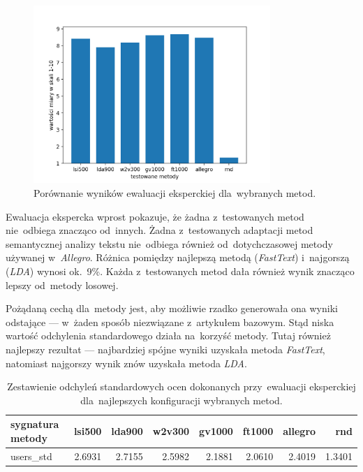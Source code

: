 \documentclass[pl]{minipw} %
\begin{document}
\begin{figure}[H]
	\centering
	\includegraphics[width=0.8\textwidth]{img/results/lsi500_lda900_w2v300_gv1000_ft1000_allegro_rnd_users.png}
	\caption{Porównanie wyników ewaluacji eksperckiej dla~wybranych metod.}
\end{figure}

Ewaluacja ekspercka wprost pokazuje, że żadna z~testowanych metod nie~odbiega znacząco od~innych. Żadna z~testowanych adaptacji metod semantycznej analizy tekstu nie~odbiega również od~dotychczasowej metody używanej w~\textit{Allegro}. Różnica pomiędzy najlepszą metodą (\textit{FastText}) i~najgorszą (\textit{LDA}) wynosi ok.~9\%. Każda z~testowanych metod dała również wynik znacząco lepszy od~metody losowej.

Pożądaną cechą dla~metody jest, aby możliwie rzadko generowała ona wyniki odstające --- w~żaden sposób niezwiązane z~artykułem bazowym. Stąd niska wartość odchylenia standardowego działa na~korzyść metody. Tutaj również najlepszy rezultat --- najbardziej spójne wyniki uzyskała metoda \textit{FastText}, natomiast najgorszy wynik znów uzyskała metoda \textit{LDA}.

\begin{table}[H]
	\centering
	\begin{tabular}{lrrrrrrr}
		\hline
		sygnatura metody&   lsi500 &   lda900 &   w2v300 &   gv1000 &   ft1000 &   allegro &     rnd \\
		\hline
		users\_std &   2.6931 &   2.7155 &   2.5982 &   2.1881 &    2.0610 &    2.4019 & 1.3401 \\
		\hline
	\end{tabular}
	\caption{Zestawienie odchyleń standardowych ocen dokonanych przy~ewaluacji eksperckiej dla~najlepszych konfiguracji wybranych metod.}
\end{table}
\end{document}
